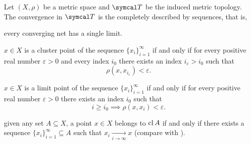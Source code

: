 \begin{proposition}\label{thm:metric_topology_convergence}
  Let \( (X, \rho) \) be a metric space and \( \Cal{T} \) be the induced metric topology. The convergence in \( \Cal{T} \) is the completely described by sequences, that is,

  \begin{defenum}
     every converging net has a single limit.

     \( x \in X \) is a cluster point of the sequence \( \{ x_i \}_{i=1}^\infty \) if and only if for every positive real number \( \varepsilon > 0 \) and every index \( i_0 \) there exists an index \( i_\varepsilon > i_0 \) such that
    \begin{equation*}
      \rho(x, x_{i_\varepsilon}) < \varepsilon.
    \end{equation*}

     \( x \in X \) is a limit point of the sequence \( \{ x_i \}_{i=1}^\infty \) if and only if for every positive real number \( \varepsilon > 0 \) there exists an index \( i_0 \) such that
    \begin{equation*}
      i \geq i_0 \implies \rho(x, x_i) < \varepsilon.
    \end{equation*}

     given any set \( A \subseteq X \), a point \( x \in X \) belongs to \( \operatorname{cl}{A} \) if and only if there exists a sequence \( \{ x_i \}_{i=1}^\infty \subseteq A \) such that \( x_i \xrightarrow[i \to \infty]{} x \) (compare with ).
  \end{defenum}
\end{proposition}
